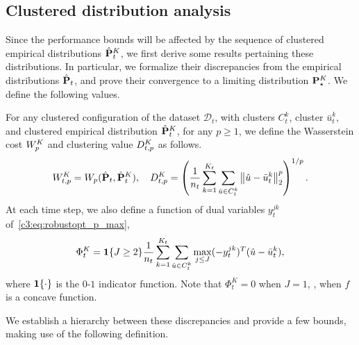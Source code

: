 \subsection{Clustered distribution analysis}
\label{sec:cluster_prop}
Since the performance bounds will be affected by the sequence of clustered empirical distributions $\hat{{\mathbf P}}^K_t$, we first derive some results pertaining these distributions. 
In particular, we formalize their discrepancies from the empirical distributions $\hat{{\mathbf P}}_t$, and prove their convergence to a limiting distribution ${\mathbf P}^K_\star$.
We define the following values. 
\begin{definition}
\label{def:cluster_value}
    For any clustered configuration of the dataset $\mathcal{D}_t$, with clusters $C^k_t$, cluster  $\bar{u}^k_t$, and clustered empirical distribution $\hat{{\mathbf P}}^K_t$, for any $p\geq 1$, we define the Wasserstein cost $W^K_{p} $ and clustering value $D^K_{t,p} $ as follows. 
    \begin{equation*}
        W^K_{t,p}= W_{p}(\hat{{\mathbf P}}_t,\hat{{\mathbf P}}^K_t), \quad D^K_{t,p} = \left(\frac{1}{n_t}\sum_{k=1}^{K_t}\sum_{\hat{u} \in C^k_t}\left\| \hat{u} - \bar{u}^k_t\right\|_2^{p}\right)^{1/{p}}.
         \end{equation*}
    At each time step, we also define a function of dual variables $y^{jk}_t$ of~\eqref{c3:eq:robustopt_p_max}, 
    \begin{equation*}\Phi^K_t = \mathbf 1\{J\geq2\}\frac{1}{n_t}\sum_{k=1}^{K_t}\sum_{\hat{u} \in C^k_t}\max_{j\leq J} (-y_t^{{jk}})^T(\hat{u} - \bar{u}^k_t), \end{equation*}
   where $\mathbf 1\{\cdot\}$ is the $0$-$1$ indicator function. Note that $\Phi^K_t = 0$ when $J=1$, \ie, when $f$ is a concave function. 
\end{definition}
 We establish a hierarchy between these discrepancies and provide a few bounds, making use of the following definition.  

